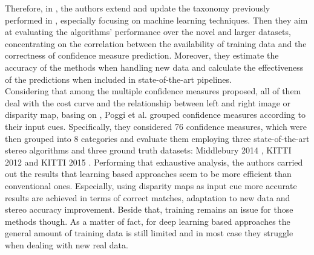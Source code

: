 Therefore, in \cite{Poggi2017}, the authors extend and update the taxonomy previously performed in \cite{Hu2012}, especially focusing on machine learning techniques.
Then they aim at evaluating the algorithms' performance over the novel and larger datasets, concentrating on the correlation between the availability of training data and the correctness of confidence measure prediction. 
Moreover, they estimate the accuracy of the methods when handling new data and calculate the effectiveness of the predictions when included in state-of-the-art pipelines.\\
Considering that among the multiple confidence measures proposed, all of them deal with the cost curve and the relationship between left and right image or disparity map, basing on \cite{Hu2012}, Poggi et al. \cite{Poggi2017} grouped confidence measures according to their input cues. 
Specifically, they considered 76 confidence measures, which were then grouped into 8 categories and evaluate them employing three state-of-the-art stereo algorithms and three ground truth datasets: Middlebury 2014 \cite{Scharstein2014}, KITTI 2012 \cite{geiger2013vision} and KITTI 2015 \cite{menze2015object}.
Performing that exhaustive analysis, the authors carried out the results that learning based approaches seem to be more efficient than conventional ones. 
Especially, using disparity maps as input cue more accurate results are achieved in terms of correct matches, adaptation to new data and stereo accuracy improvement. 
Beside that, training remains an issue for those methods though. 
As a matter of fact, for deep learning based approaches the general amount of training data is still limited and in most case they struggle when dealing with new real data.\\















